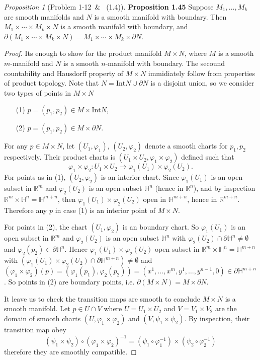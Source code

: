 \documentclass[a4paper]{article}
\theoremstyle{remark}
\newtheorem{prop}{Proposition}
\newcommand{\hn}{\mathbb{H}^n} %
\newcommand{\doo}{\partial}    %
\begin{document}
\begin{prop}[Problem 1-12 \cite{LeeSM} \,\& \cite{Kosinski} \, (1.4)] \textbf{Proposition 1.45}
Suppose $M_1,\dots,M_k$ are smooth manifolds and $N$ is a smooth manifold with boundary. Then $M_1 \times \cdots \times M_k \times N$ is a smooth manifold with boundary, and $\doo (M_1 \times \cdots \times M_k \times N) = M_1 \times \cdots \times M_k \times \doo N$. 
\end{prop}
\begin{proof}
Its enough to show for the product manifold $M \times N$, where $M$ is a smooth $m$-manifold and $N$ is a smooth $n$-manifold with boundary. The secound countability and Hausdorff property of $M \times N$ immidiately follow from properties of product topology. Note that  $N = \text{Int}N \cup \doo N$ is a disjoint union, so we consider two types of points in $M \times N$
\begin{enumerate}[nolistsep]
\item[(1)] $p = (p_1,p_2) \in M \times \text{Int}N$,
\item[(2)] $p =(p_1,p_2) \in M \times \doo N$.
\end{enumerate}
For any $p \in M \times N$, let $(U_1,\varphi_1)$, $(U_2,\varphi_2)$ denote a smooth charts for $p_1,p_2$ respectively. Their product charts is $(U_1 \times U_2, \varphi_1 \times \varphi_2)$ defined such that
$$
\varphi_1 \times \varphi_2 : U_1 \times U_2 \to \varphi_1(U_1) \times \varphi_2(U_2).
$$
For points as in (1), $(U_2,\varphi_2)$ is an interior chart. Since $\varphi_1(U_1)$ is an open subset in  $\mathbb{R}^m$ and $\varphi_2(U_2)$ is an open subset $\mathbb{H}^n$ (hence in $\mathbb{R}^n$), and by inspection $\mathbb{R}^m \times \hn = \mathbb{H}^{m+n}$, then $\varphi_1(U_1) \times \varphi_2(U_2)$ open in $\mathbb{H}^{m+n}$, hence in $\mathbb{R}^{m+n}$. Therefore any $p$ in case (1) is an interior point of $M \times N$. 

For points in (2), the chart $(U_1,\varphi_2)$ is an boundary chart. So $\varphi_1(U_1)$ is an open subset in  $\mathbb{R}^m$ and $\varphi_2(U_2)$ is an open subset $\mathbb{H}^n$ with $\varphi_2(U_2) \cap \doo \hn \neq \emptyset$ and $\varphi_2(p_2) \in \doo \hn$. Hence  $\varphi_1(U_1) \times \varphi_2(U_2)$ open subset in $\mathbb{R}^m \times \hn = \mathbb{H}^{m+n}$ with $(\varphi_1(U_1) \times \varphi_2(U_2) \cap \doo \mathbb{H}^{m+n}) \neq \emptyset$ and $(\varphi_1 \times \varphi_2)(p)=(\varphi_1(p_1), \varphi_2(p_2)) = (x^1,\dots,x^m,y^1,\dots,y^{n-1},0) \in \doo \mathbb{H}^{m+n}$. So points in (2) are boundary points, i.e. $\doo (M \times N) = M \times \doo N$. 

It leave us to check the transition maps are smooth to conclude $M \times N$ is a smooth manifold. Let $p\in U \cap V$ where $U=U_1 \times U_2$ and $V = V_1 \times V_2$ are the domain of smooth charts $(U,\varphi_1 \times \varphi_2)$ and $(V,\psi_1 \times \psi_2)$. By inspection, their transition map obey
$$
(\psi_1 \times \psi_2) \circ (\varphi_1 \times \varphi_2)^{-1} = (\psi_1 \circ \varphi_1^{-1}) \times (\psi_2 \circ \varphi_2^{-1})
$$
therefore they are smoothly compatible.
\end{proof}
\end{document}
